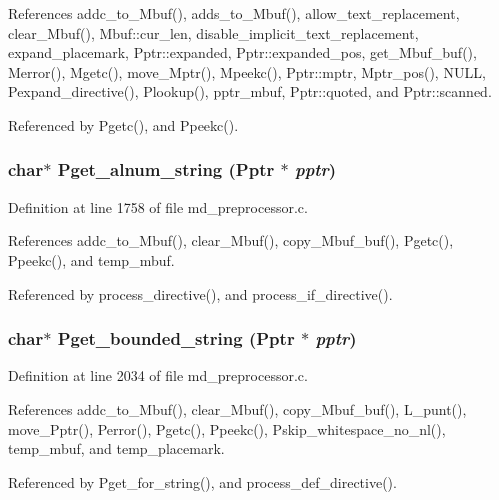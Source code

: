 References addc\_\-to\_\-Mbuf(), adds\_\-to\_\-Mbuf(), allow\_\-text\_\-replacement, clear\_\-Mbuf(), Mbuf::cur\_\-len, disable\_\-implicit\_\-text\_\-replacement, expand\_\-placemark, Pptr::expanded, Pptr::expanded\_\-pos, get\_\-Mbuf\_\-buf(), Merror(), Mgetc(), move\_\-Mptr(), Mpeekc(), Pptr::mptr, Mptr\_\-pos(), NULL, Pexpand\_\-directive(), Plookup(), pptr\_\-mbuf, Pptr::quoted, and Pptr::scanned.

Referenced by Pgetc(), and Ppeekc().
\subsubsection{\setlength{\rightskip}{0pt plus 5cm}char$\ast$ Pget\_\-alnum\_\-string (\bf{Pptr} $\ast$ {\em pptr})}\label{md__preprocessor_8c_c229bcda9d9321b3abe143a15e46b6ac}




Definition at line 1758 of file md\_\-preprocessor.c.

References addc\_\-to\_\-Mbuf(), clear\_\-Mbuf(), copy\_\-Mbuf\_\-buf(), Pgetc(), Ppeekc(), and temp\_\-mbuf.

Referenced by process\_\-directive(), and process\_\-if\_\-directive().
\subsubsection{\setlength{\rightskip}{0pt plus 5cm}char$\ast$ Pget\_\-bounded\_\-string (\bf{Pptr} $\ast$ {\em pptr})}\label{md__preprocessor_8c_dc875874dad3e9abb6cb02d654e5e897}




Definition at line 2034 of file md\_\-preprocessor.c.

References addc\_\-to\_\-Mbuf(), clear\_\-Mbuf(), copy\_\-Mbuf\_\-buf(), L\_\-punt(), move\_\-Pptr(), Perror(), Pgetc(), Ppeekc(), Pskip\_\-whitespace\_\-no\_\-nl(), temp\_\-mbuf, and temp\_\-placemark.

Referenced by Pget\_\-for\_\-string(), and process\_\-def\_\-directive().

